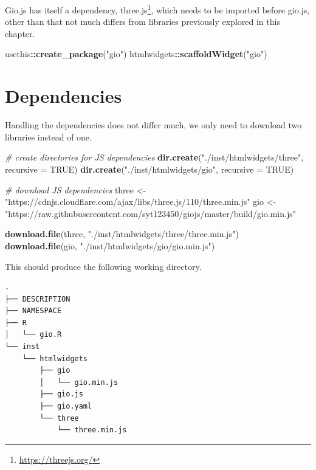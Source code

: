 \documentclass[
]{krantz}
\makeatletter
\newenvironment{Shaded}{\begin{snugshade}}{\end{snugshade}}
\newcommand{\CommentTok}[1]{\textcolor[rgb]{0.37,0.37,0.37}{\textit{#1}}}
\newcommand{\DataTypeTok}[1]{\textcolor[rgb]{0.27,0.27,0.27}{#1}}
\newcommand{\KeywordTok}[1]{\textcolor[rgb]{0.27,0.27,0.27}{\textbf{#1}}}
\newcommand{\NormalTok}[1]{#1}
\newcommand{\OperatorTok}[1]{\textcolor[rgb]{0.43,0.43,0.43}{\textbf{#1}}}
\newcommand{\OtherTok}[1]{\textcolor[rgb]{0.37,0.37,0.37}{#1}}
\newcommand{\StringTok}[1]{\textcolor[rgb]{0.5,0.5,0.5}{#1}}
\renewcommand{\href}[2]{#2\footnote{\url{#1}}}
\newenvironment{kframe}{%
\medskip{}
\setlength{\fboxsep}{.8em}
 \def\at@end@of@kframe{}%
 \ifinner\ifhmode%
  \def\at@end@of@kframe{\end{minipage}}%
  \begin{minipage}{\columnwidth}%
 \fi\fi%
 \def\FrameCommand##1{\hskip\@totalleftmargin \hskip-\fboxsep
 \colorbox{shadecolor}{##1}\hskip-\fboxsep
     \hskip-\linewidth \hskip-\@totalleftmargin \hskip\columnwidth}%
 \MakeFramed {\advance\hsize-\width
   \@totalleftmargin\z@ \linewidth\hsize
   \@setminipage}}%
 {\par\unskip\endMakeFramed%
 \at@end@of@kframe}
\renewenvironment{Shaded}{\begin{kframe}}{\end{kframe}}
\makeatother
\begin{document}
Gio.js has itself a dependency, \href{https://threejs.org/}{three.js}, which needs to be imported before gio.js, other than that not much differs from libraries previously explored in this chapter.

\begin{Shaded}
\begin{Highlighting}[]
\NormalTok{usethis}\OperatorTok{::}\KeywordTok{create\_package}\NormalTok{(}\StringTok{"gio"}\NormalTok{)}
\NormalTok{htmlwidgets}\OperatorTok{::}\KeywordTok{scaffoldWidget}\NormalTok{(}\StringTok{"gio"}\NormalTok{)}
\end{Highlighting}
\end{Shaded}

\hypertarget{dependencies}{%
\section{Dependencies}\label{dependencies}}

Handling the dependencies does not differ much, we only need to download two libraries instead of one.

\begin{Shaded}
\begin{Highlighting}[]
\CommentTok{\# create directories for JS dependencies}
\KeywordTok{dir.create}\NormalTok{(}\StringTok{"./inst/htmlwidgets/three"}\NormalTok{, }\DataTypeTok{recursive =} \OtherTok{TRUE}\NormalTok{)}
\KeywordTok{dir.create}\NormalTok{(}\StringTok{"./inst/htmlwidgets/gio"}\NormalTok{, }\DataTypeTok{recursive =} \OtherTok{TRUE}\NormalTok{)}

\CommentTok{\# download JS dependencies}
\NormalTok{three <{-}}\StringTok{ "https://cdnjs.cloudflare.com/ajax/libs/three.js/110/three.min.js"}
\NormalTok{gio <{-}}\StringTok{ "https://raw.githubusercontent.com/syt123450/giojs/master/build/gio.min.js"}

\KeywordTok{download.file}\NormalTok{(three, }\StringTok{"./inst/htmlwidgets/three/three.min.js"}\NormalTok{)}
\KeywordTok{download.file}\NormalTok{(gio, }\StringTok{"./inst/htmlwidgets/gio/gio.min.js"}\NormalTok{)}
\end{Highlighting}
\end{Shaded}

This should produce the following working directory.

\begin{verbatim}
.
├── DESCRIPTION
├── NAMESPACE
├── R
│   └── gio.R
└── inst
    └── htmlwidgets
        ├── gio
        │   └── gio.min.js
        ├── gio.js
        ├── gio.yaml
        └── three
            └── three.min.js
\end{verbatim}
\end{document}
